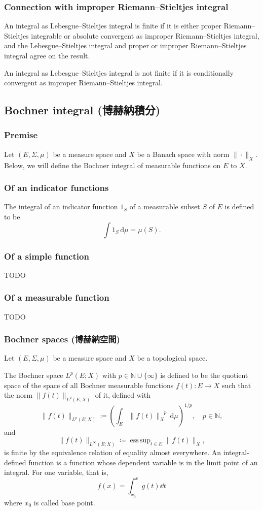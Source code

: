 \documentclass[a4paper,12pt]{report}
\begin{document}
\begin{itemize}
\begin{itemize}
\subsubsection{Connection with improper Riemann–Stieltjes integral}
An integral as Lebesgue–Stieltjes integral is finite if it is either proper Riemann–Stieltjes integrable or absolute convergent as improper Riemann–Stieltjes integral, and the Lebesgue–Stieltjes integral and proper or improper Riemann–Stieltjes integral agree on the result.

An integral as Lebesgue–Stieltjes integral is not finite if it is conditionally convergent as improper Riemann–Stieltjes integral.
\subsection{Bochner integral (博赫納積分)}
\subsubsection{Premise}
Let $(E,\Sigma ,\mu )$ be a measure space and $X$ be a Banach space with norm $\|\cdot\|_X$. Below, we will define the Bochner integral of measurable functions on $E$ to $X$.
\subsubsection{Of an indicator functions}
The integral of an indicator function $1_S$ of a measurable subset $S$ of $E$ is defined to be
\[\int 1_{S}\,\mathrm{d}{\mu} =\mu (S).\]
\subsubsection{Of a simple function}
TODO
\subsubsection{Of a measurable function}
TODO
\subsubsection{Bochner spaces (博赫納空間)}
Let $(E,\Sigma,\mu)$ be a measure space and $X$ be a topological space. 

The Bochner space $L^p(E;X)$ with $p\in\mathbb{N}\cup\{\infty\}$ is defined to be the quotient space of the space of all Bochner measurable functions $f(t)\colon E\to X$ such that the norm $\|f(t)\|_{L^p(E;X)}$ of it, defined with
\[\|f(t)\|_{L^p(E;X)}\coloneq\left(\int_E\|f(t)\|_X^{\phantom{X}p}\,\mathrm{d}\mu\right)^{1/p},\quad p\in\mathbb{N},\]
and
\[\|f(t)\|_{L^{\infty }(E;X)}\coloneq\operatorname{ess\,sup}_{t\in E}\|f(t)\|_{X},\]
is finite by the equivalence relation of equality almost everywhere.
An integral-defined function is a function whose dependent variable is in the limit point of an integral. For one variable, that is,
\[f(x)=\int_{x_0}^xg(t)\dd{t}\]
where $x_0$ is called base point.




\end{itemize}
\end{itemize}
\end{document}
